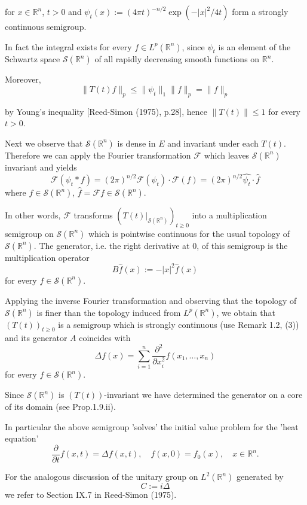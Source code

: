 \documentclass{article}
\begin{document}
for $x \in \mathbb{R}^n$, $t>0$ and $\psi_t(x) := (4\pi t)^{-n/2}\exp(-|x|^2/4t)$ form a strongly continuous semigroup.

In fact the integral exists for every $f \in L^p(\mathbb{R}^n)$, since $\psi_t$ is an element of the Schwartz space $\mathcal{S}(\mathbb{R}^n)$ of all rapidly decreasing smooth functions on $\mathbb{R}^n$.

Moreover,
\[
\|T(t)f\|_p \leq \|\psi_t\|_1\|f\|_p = \|f\|_p
\]

by Young's inequality [Reed-Simon (1975), p.28], hence $\|T(t)\| \leq 1$ for every $t>0$.

Next we observe that $\mathcal{S}(\mathbb{R}^n)$ is dense in $E$ and invariant under each $T(t)$.
Therefore we can apply the Fourier transformation $\mathcal{F}$ which leaves $\mathcal{S}(\mathbb{R}^n)$ invariant and yields
\[
\mathcal{F}(\psi_t * f) = (2\pi)^{n/2}\mathcal{F}(\psi_t) \cdot \mathcal{F}(f) = (2\pi)^{n/2}\hat{\psi_t} \cdot \hat{f}
\]
where $f \in \mathcal{S}(\mathbb{R}^n)$, $\hat{f} = \mathcal{F}f \in \mathcal{S}(\mathbb{R}^n)$.

In other words, $\mathcal{F}$ transforms $(T(t)|_{\mathcal{S}(\mathbb{R}^n)})_{t \geq 0}$ into a multiplication semigroup on $\mathcal{S}(\mathbb{R}^n)$ which is pointwise continuous for the usual topology of $\mathcal{S}(\mathbb{R}^n)$.
The generator, i.e. the right derivative at 0, of this semigroup is the multiplication operator
\[
B\hat{f}(x) := -|x|^2\hat{f}(x)
\]
for every $f \in \mathcal{S}(\mathbb{R}^n)$.

Applying the inverse Fourier transformation and observing that the topology of $\mathcal{S}(\mathbb{R}^n)$ is finer than the topology induced from $L^p(\mathbb{R}^n)$, we obtain that $(T(t))_{t \geq 0}$ is a semigroup which is strongly continuous (use Remark 1.2, (3)) and its generator $A$ coincides with
\[
\Delta f(x) = \sum_{i=1}^n \frac{\partial^2}{\partial x_i^2}f(x_1,\ldots,x_n)
\]
for every $f \in \mathcal{S}(\mathbb{R}^n)$.

Since $\mathcal{S}(\mathbb{R}^n)$ is $(T(t))$-invariant we have determined the generator on a core of its domain (see Prop.1.9.ii).

In particular the above semigroup 'solves' the initial value problem for the 'heat equation'
\[
\frac{\partial}{\partial t}f(x,t) = \Delta f(x,t), \quad f(x,0) = f_0(x), \quad x \in \mathbb{R}^n.
\]

For the analogous discussion of the unitary group on $L^2(\mathbb{R}^n)$ generated by
\[
C := i\Delta
\]
we refer to Section IX.7 in Reed-Simon (1975).
\end{document}

